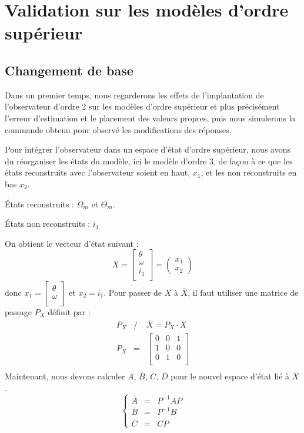 \section{Validation sur les modèles d'ordre supérieur}
\subsection{Changement de base}
Dans un premier temps, nous regarderons les effets de l'implantation de l'observateur d'ordre 2 sur les modèles d'ordre supérieur et plus précisément l'erreur d'estimation et le placement des valeurs propres, puis nous simulerons la commande obtenu pour observé les modifications des réponses.

Pour intégrer l'observateur dans un espace d'état d'ordre supérieur, nous avons du réorganiser les états du modèle, ici le modèle d'ordre 3, de façon à ce que les états reconstruits avec l'observateur soient en haut, $x_1$, et les non reconstruits en bas $x_2$.

\noindent\textbullet\hspace{2mm} États reconstruits : $\Omega_m$ et $ \Theta_m$.

\noindent\textbullet\hspace{2mm} États non reconstruits : $i_1$

On obtient le vecteur d'état suivant : 
\begin{equation}
\overline{X} = \begin{bmatrix}
\theta\\
\omega\\
i_1\\
\end{bmatrix} = \begin{pmatrix}
x_1\\x_2
\end{pmatrix}
\end{equation}
donc $x_1 = \begin{bmatrix}
\theta\\
\omega\\ \end{bmatrix}$ et $x_2 = i_1$. Pour passer de $X$ à $\overline{X}$, il faut utiliser une matrice de passage $P_X$ définit par :
 \begin{eqnarray}
 P_X &/&  \overline{X} =P_X \cdot X \\
 P_X &=&\begin{bmatrix}
 0 & 0 & 1 \\
 1 & 0 & 0 \\
 0 & 1 & 0 \\
\end{bmatrix}  \\
 \end{eqnarray}
Maintenant, nous devons calculer $\overline{A}$, $\overline{B}$, $\overline{C}$, $\overline{D}$ pour le nouvel espace d'état lié à $\overline{X}$.
\begin{equation}%
	\left\lbrace%
	\begin{matrix}
		\overline{A} &=& P^{-1} A P \\%
		\overline{B} &=& P^{-1} B \\%
		\overline{C} &=& C P%
	\end{matrix}
\right.%
\end{equation}

